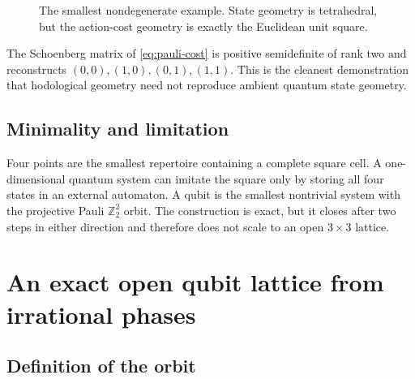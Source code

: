 \documentclass[11pt]{article}
\theoremstyle{definition}
\theoremstyle{remark}
\newcommand{\Z}{\mathbb Z}
\begin{document}
\begin{figure}[t]
\centering
{}
\caption{The smallest nondegenerate example. State geometry is tetrahedral,
but the action-cost geometry is exactly the Euclidean unit square.}
\label{fig:pauli-square}
\end{figure}

The Schoenberg matrix of \cref{eq:pauli-cost} is positive semidefinite of rank
two and reconstructs $(0,0),(1,0),(0,1),(1,1)$. This is the cleanest
demonstration that hodological geometry need not reproduce ambient quantum
state geometry.

\subsection{Minimality and limitation}

Four points are the smallest repertoire containing a complete square cell.
A one-dimensional quantum system can imitate the square only by storing all
four states in an external automaton. A qubit is the smallest nontrivial
system with the projective Pauli $\Z_2^2$ orbit. The construction is exact,
but it closes after two steps in either direction and therefore does not scale
to an open $3\times3$ lattice.

\section{An exact open qubit lattice from irrational phases}
\label{sec:irrational}

\subsection{Definition of the orbit}
\end{document}
